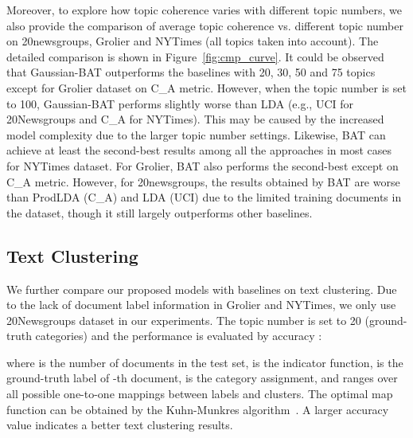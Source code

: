 \documentclass[11pt,a4paper]{article}
\begin{document}
{\color{black}Moreover, to explore how topic coherence varies with different topic numbers,} we also provide the comparison of average topic coherence vs. different topic number on 20newsgroups, Grolier and NYTimes (all topics taken into account). The detailed comparison is shown in Figure~\ref{fig:cmp_curve}. {\color{black}It could be observed that Gaussian-BAT outperforms the baselines with 20, 30, 50 and 75 topics except for Grolier dataset on C\_A metric. However, when the topic number is set to 100, Gaussian-BAT performs slightly worse than LDA (e.g., UCI for 20Newsgroups and C\_A for NYTimes). This may be caused by the increased model complexity due to the larger topic number settings. Likewise, BAT can achieve at least the second-best results among all the approaches in most cases for NYTimes dataset. For Grolier, BAT also performs the second-best except on C\_A metric.   However, for 20newsgroups, the results obtained by BAT are worse than ProdLDA (C\_A) and LDA (UCI) due to the limited training documents in the dataset, though it still largely outperforms other baselines.} 

\subsection{Text Clustering}

We further compare our proposed models with baselines on text clustering. 
Due to the lack of document label information in Grolier and NYTimes, we only use 20Newsgroups dataset in our experiments. The topic number is set to 20 (ground-truth categories) and the performance is evaluated by accuracy :

where  is the number of documents in the test set,  is the indicator function,  is the ground-truth label of -th document,  is the category assignment, {\color{black}and  ranges over all possible one-to-one mappings between labels and clusters}. {\color{black} The optimal map function can be obtained by the Kuhn-Munkres algorithm~\cite{kuhn1955hungarian}. A larger accuracy value indicates a better text clustering results. }
\begin{table}[h]
\centering
\small
{}
\caption{Text clustering accuracy on 20Newsgroups (20NG). `G-BAT' refers to `Gaussian-BAT'. The best result is highlighted in bold.}
\label{tbs:unsupervised_classification}
\end{table}  
\end{document}
